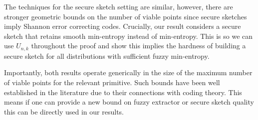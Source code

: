 The techniques for the secure sketch setting are similar, however, there are stronger geometric bounds on the number of viable points since secure sketches imply Shannon error correcting codes.  Crucially, our result considers a secure sketch that retains smooth min-entropy instead of min-entropy.  This is so we can use $U_{n,k}$ throughout the proof and show this implies the hardness of building a secure sketch for all distributions with sufficient fuzzy min-entropy.  


Importantly, both results operate generically in the size of the maximum number of viable points for the relevant primitive.  Such bounds have been well established in the literature due to their connections with coding theory.  This means if one can provide a new bound on fuzzy extractor or secure sketch quality this can be directly used in our results.
